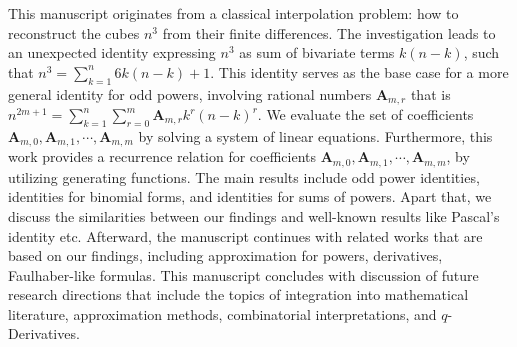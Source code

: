 This manuscript originates from a classical interpolation problem: how to reconstruct the cubes $n^3$
from their finite differences.
The investigation leads to an unexpected identity expressing $n^3$ as sum of bivariate terms $k(n-k)$,
such that $n^3=\sum_{k=1}^{n} 6k(n-k) + 1$.
This identity serves as the base case for a more general identity for odd powers,
involving rational numbers $\mathbf{A}_{m,r}$ that is
$n^{2m+1} = \sum_{k=1}^{n} \sum_{r=0}^{m} \mathbf{A}_{m,r} k^r (n-k)^r$.
We evaluate the set of coefficients $\mathbf{A}_{m,0}, \mathbf{A}_{m,1}, \cdots, \mathbf{A}_{m,m}$
by solving a system of linear equations.
Furthermore, this work provides a recurrence relation
for coefficients $\mathbf{A}_{m,0}, \mathbf{A}_{m,1}, \cdots, \mathbf{A}_{m,m}$, by utilizing
generating functions.
The main results include odd power identities, identities for binomial forms,
and identities for sums of powers.
Apart that, we discuss the similarities between our findings and well-known results like Pascal's identity etc.
Afterward, the manuscript continues with related works that are based on our findings,
including approximation for powers,
derivatives, Faulhaber-like formulas.
This manuscript concludes with discussion of future research directions that include
the topics of integration into mathematical literature, approximation methods, combinatorial interpretations,
and $q$-Derivatives.
